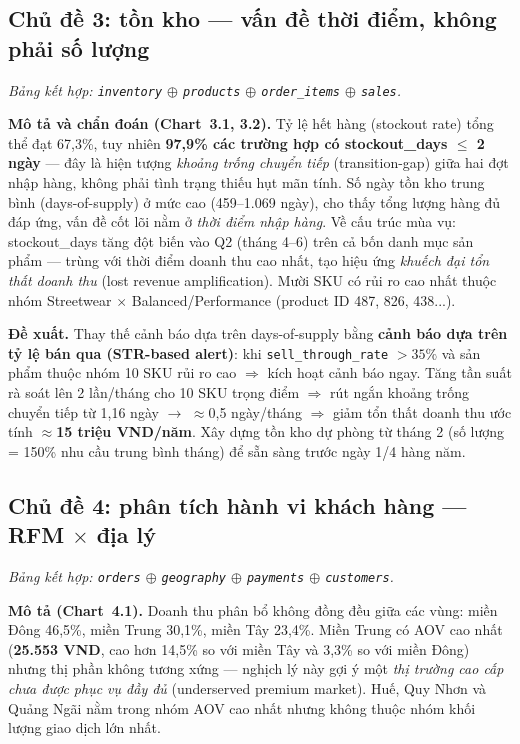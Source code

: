 \documentclass{article}
\begin{document}
\subsection{Chủ đề 3: tồn kho --- vấn đề thời điểm, không phải số lượng}
\label{sec:theme3}
\textit{Bảng kết hợp: \texttt{inventory} $\oplus$ \texttt{products} $\oplus$ \texttt{order\_items} $\oplus$ \texttt{sales}.}

\textbf{Mô tả và chẩn đoán (Chart~3.1, 3.2).} Tỷ lệ hết hàng (stockout rate) tổng thể đạt 67,3\%, tuy nhiên \textbf{97,9\% các trường hợp có stockout\_days $\leq$ 2 ngày} --- đây là hiện tượng \textit{khoảng trống chuyển tiếp} (transition-gap) giữa hai đợt nhập hàng, không phải tình trạng thiếu hụt mãn tính. Số ngày tồn kho trung bình (days-of-supply) ở mức cao (459--1.069 ngày), cho thấy tổng lượng hàng đủ đáp ứng, vấn đề cốt lõi nằm ở \textit{thời điểm nhập hàng}. Về cấu trúc mùa vụ: stockout\_days tăng đột biến vào Q2 (tháng 4--6) trên cả bốn danh mục sản phẩm --- trùng với thời điểm doanh thu cao nhất, tạo hiệu ứng \textit{khuếch đại tổn thất doanh thu} (lost revenue amplification). Mười SKU có rủi ro cao nhất thuộc nhóm Streetwear $\times$ Balanced/Performance (product ID 487, 826, 438...).

\textbf{Đề xuất.} Thay thế cảnh báo dựa trên days-of-supply bằng \textbf{cảnh báo dựa trên tỷ lệ bán qua (STR-based alert)}: khi \texttt{sell\_through\_rate} $> 35\%$ và sản phẩm thuộc nhóm 10 SKU rủi ro cao $\Rightarrow$ kích hoạt cảnh báo ngay. Tăng tần suất rà soát lên 2 lần/tháng cho 10 SKU trọng điểm $\Rightarrow$ rút ngắn khoảng trống chuyển tiếp từ 1,16 ngày $\rightarrow$ $\approx$0,5 ngày/tháng $\Rightarrow$ giảm tổn thất doanh thu ước tính \textbf{$\approx$15 triệu VND/năm}. Xây dựng tồn kho dự phòng từ tháng 2 (số lượng = 150\% nhu cầu trung bình tháng) để sẵn sàng trước ngày 1/4 hàng năm.

\subsection{Chủ đề 4: phân tích hành vi khách hàng --- RFM $\times$ địa lý}
\label{sec:theme4}
\textit{Bảng kết hợp: \texttt{orders} $\oplus$ \texttt{geography} $\oplus$ \texttt{payments} $\oplus$ \texttt{customers}.}

\textbf{Mô tả (Chart~4.1).} Doanh thu phân bổ không đồng đều giữa các vùng: miền Đông 46,5\%, miền Trung 30,1\%, miền Tây 23,4\%. Miền Trung có AOV cao nhất (\textbf{25.553 VND}, cao hơn 14,5\% so với miền Tây và 3,3\% so với miền Đông) nhưng thị phần không tương xứng --- nghịch lý này gợi ý một \textit{thị trường cao cấp chưa được phục vụ đầy đủ} (underserved premium market). Huế, Quy Nhơn và Quảng Ngãi nằm trong nhóm AOV cao nhất nhưng không thuộc nhóm khối lượng giao dịch lớn nhất.
\end{document}

